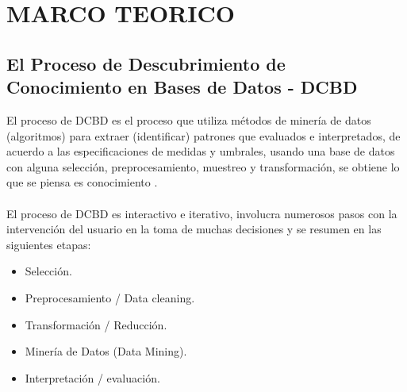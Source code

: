 \chapter{MARCO TEORICO}
\section{El Proceso de Descubrimiento de Conocimiento en Bases de Datos - DCBD}
El proceso de DCBD es el proceso que utiliza m\'etodos de miner\'ia de datos (algoritmos)
para extraer
(identificar) patrones que evaluados e interpretados, de acuerdo a las especificaciones
de medidas y umbrales,
usando una base de datos con alguna selecci\'on, preprocesamiento, muestreo y
transformaci\'on, se obtiene lo que
se piensa es conocimiento \cite{9}.\\
\\
El proceso de DCBD es interactivo e iterativo, involucra numerosos pasos con la
intervenci\'on del usuario en la
toma de muchas decisiones y se resumen en las siguientes etapas:

\begin{itemize}
\item Selecci\'on.
\item Preprocesamiento / Data cleaning.
\item Transformaci\'on / Reducci\'on.
\item Miner\'ia de Datos (Data Mining).
\item Interpretaci\'on / evaluaci\'on.
\end{itemize}

